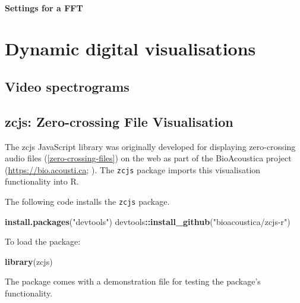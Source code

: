 \documentclass[
]{book}
\newenvironment{Shaded}{\begin{snugshade}}{\end{snugshade}}
\newcommand{\FunctionTok}[1]{\textcolor[rgb]{0.13,0.29,0.53}{\textbf{#1}}}
\newcommand{\NormalTok}[1]{#1}
\newcommand{\SpecialCharTok}[1]{\textcolor[rgb]{0.81,0.36,0.00}{\textbf{#1}}}
\newcommand{\StringTok}[1]{\textcolor[rgb]{0.31,0.60,0.02}{#1}}
\begin{document}
\hypertarget{settings-for-a-fft}{%
\subsubsection{Settings for a FFT}\label{settings-for-a-fft}}

\hypertarget{dynamic-digital-visualisations}{%
\chapter{Dynamic digital visualisations}\label{dynamic-digital-visualisations}}

\hypertarget{video-spectrograms}{%
\section{Video spectrograms}\label{video-spectrograms}}

\hypertarget{zcjs-zero-crossing-file-visualisation}{%
\section{zcjs: Zero-crossing File Visualisation}\label{zcjs-zero-crossing-file-visualisation}}

The zcjs JavaScript library was originally developed for displaying zero-crossing audio files (\ref{zero-crossing-files}) on the web as part of the BioAcoustica project (\url{https://bio.acousti.ca}; \citet{baker2015bioacoustica}). The \texttt{zcjs} package \citep{zcjsr} imports this visualisation functionality into R.

The following code installs the \texttt{zcjs} package.

\begin{Shaded}
\begin{Highlighting}[]
\FunctionTok{install.packages}\NormalTok{(}\StringTok{"devtools"}\NormalTok{)}
\NormalTok{devtools}\SpecialCharTok{::}\FunctionTok{install\_github}\NormalTok{(}\StringTok{"bioacoustica/zcjs{-}r"}\NormalTok{)}
\end{Highlighting}
\end{Shaded}

To load the package:

\begin{Shaded}
\begin{Highlighting}[]
\FunctionTok{library}\NormalTok{(zcjs)}
\end{Highlighting}
\end{Shaded}

The package comes with a demonstration file for testing the package's functionality.
\end{document}
